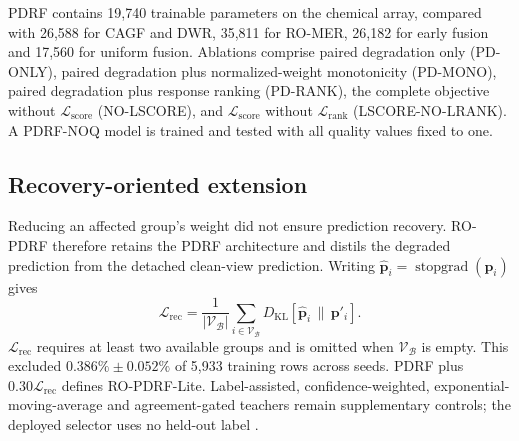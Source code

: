 \documentclass[11pt]{article}
\begin{document}
PDRF contains 19,740 trainable parameters on the chemical array, compared with 26,588 for CAGF and DWR, 35,811 for RO-MER, 26,182 for early fusion and 17,560 for uniform fusion. Ablations comprise paired degradation only (PD-ONLY), paired degradation plus normalized-weight monotonicity (PD-MONO), paired degradation plus response ranking (PD-RANK), the complete objective without $\mathcal L_{\mathrm{score}}$ (NO-LSCORE), and $\mathcal L_{\mathrm{score}}$ without $\mathcal L_{\mathrm{rank}}$ (LSCORE-NO-LRANK). A PDRF-NOQ model is trained and tested with all quality values fixed to one.

\subsection{Recovery-oriented extension}

Reducing an affected group's weight did not ensure prediction recovery. RO-PDRF therefore retains the PDRF architecture and distils the degraded prediction from the detached clean-view prediction. Writing $\widehat{\mathbf p}_i=\operatorname{stopgrad}(\mathbf p_i)$ gives
\begin{equation}
\mathcal L_{\mathrm{rec}}=\frac{1}{|\mathcal V_{\mathcal B}|}
\sum_{i\in\mathcal V_{\mathcal B}}D_{\mathrm{KL}}\!\left[\widehat{\mathbf p}_i\,\|\,\mathbf p'_i\right].
\end{equation}
$\mathcal L_{\mathrm{rec}}$ requires at least two available groups and is omitted when $\mathcal V_{\mathcal B}$ is empty. This excluded $0.386\%\pm0.052\%$ of 5,933 training rows across seeds. PDRF plus $0.30\mathcal L_{\mathrm{rec}}$ defines RO-PDRF-Lite. Label-assisted, confidence-weighted, exponential-moving-average and agreement-gated teachers remain supplementary controls; the deployed selector uses no held-out label \citep{tarvainen2017mean}.
\end{document}
